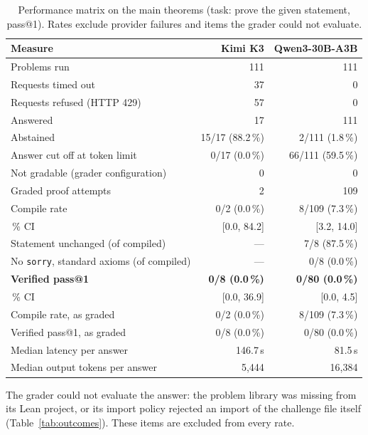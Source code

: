 \documentclass[11pt]{article}
\begin{document}
\begin{table}[!htbp]
\centering
\begin{threeparttable}
\caption{Performance matrix on the main theorems (task: prove the given statement, pass@1). Rates exclude provider failures and items the grader could not evaluate.}
\label{tab:matrix}
\small
\begin{tabular}{@{}lrr@{}}
\toprule
Measure & Kimi K3 & Qwen3-30B-A3B \\
\midrule
Problems run & 111 & 111 \\
Requests timed out & 37 & 0 \\
Requests refused (HTTP 429) & 57 & 0 \\
Answered & 17 & 111 \\
Abstained\tnote{b} & 15/17 (88.2\,\%) & 2/111 (1.8\,\%) \\
Answer cut off at token limit & 0/17 (0.0\,\%) & 66/111 (59.5\,\%) \\
Not gradable (grader configuration)\tnote{a} & 0 & 0 \\
Graded proof attempts & 2 & 109 \\
\midrule
Compile rate\tnote{c} & 0/2 (0.0\,\%) & 8/109 (7.3\,\%) \\
\quad 95\,\% CI & [0.0, 84.2] & [3.2, 14.0] \\
Statement unchanged (of compiled) & --- & 7/8 (87.5\,\%) \\
No \texttt{sorry}, standard axioms (of compiled) & --- & 0/8 (0.0\,\%) \\
\textbf{Verified pass@1}\tnote{d} & \textbf{0/8 (0.0\,\%)} & \textbf{0/80 (0.0\,\%)} \\
\quad 95\,\% CI & [0.0, 36.9] & [0.0, 4.5] \\
\midrule
Compile rate, as graded\tnote{e} & 0/2 (0.0\,\%) & 8/109 (7.3\,\%) \\
Verified pass@1, as graded\tnote{e} & 0/8 (0.0\,\%) & 0/80 (0.0\,\%) \\
\midrule
Median latency per answer & 146.7\,s & 81.5\,s \\
Median output tokens per answer & 5{,}444 & 16{,}384 \\
\bottomrule
\end{tabular}
\begin{tablenotes}\footnotesize
\item[a] The grader could not evaluate the answer: the problem library was missing from its Lean project, or its import policy rejected an import of the challenge file itself (Table~\ref{tab:outcomes}). These items are excluded from every rate.

\end{tablenotes}
\end{threeparttable}
\end{table}
\end{document}
